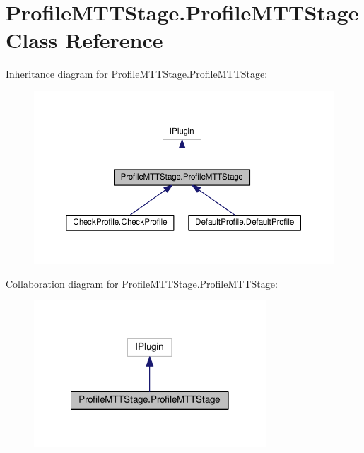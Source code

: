 \hypertarget{class_profile_m_t_t_stage_1_1_profile_m_t_t_stage}{\section{Profile\-M\-T\-T\-Stage.\-Profile\-M\-T\-T\-Stage Class Reference}
\label{class_profile_m_t_t_stage_1_1_profile_m_t_t_stage}
}


Inheritance diagram for Profile\-M\-T\-T\-Stage.\-Profile\-M\-T\-T\-Stage\-:
\nopagebreak
\begin{figure}[H]
\begin{center}
\leavevmode
\includegraphics[width=350pt]{class_profile_m_t_t_stage_1_1_profile_m_t_t_stage__inherit__graph}
\end{center}
\end{figure}


Collaboration diagram for Profile\-M\-T\-T\-Stage.\-Profile\-M\-T\-T\-Stage\-:
\nopagebreak
\begin{figure}[H]
\begin{center}
\leavevmode
\includegraphics[width=246pt]{class_profile_m_t_t_stage_1_1_profile_m_t_t_stage__coll__graph}
\end{center}
\end{figure}
